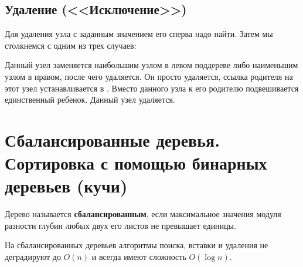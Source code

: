 \subsection{Удаление (<<Исключение>>)}
Для удаления узла с заданным значением его сперва надо найти. Затем мы столкнемся с одним из трех случаев:
\begin{enumerate}
   Данный узел заменяется наибольшим узлом в левом поддереве либо наименьшим узлом в правом, после чего удаляется.
   Он просто удаляется, ссылка родителя на этот узел устанавливается в .
   Вместо данного узла к его родителю подвешивается единственный ребенок. Данный узел удаляется.
\end{enumerate}


\section{Сбалансированные деревья. Сортировка с помощью бинарных деревьев (кучи)}
Дерево называется \textbf{сбалансированным}, если максимальное значения модуля разности глубин
любых двух его листов не превышает единицы.

На сбалансированных деревьев алгоритмы поиска, вставки и удаления не деградируют до $O(n)$
и всегда имеют сложность $O(\log n)$.

